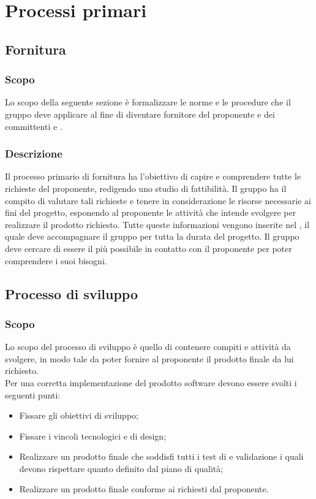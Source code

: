 \section{Processi primari}
\subsection{Fornitura}
\subsubsection{Scopo}
Lo scopo della seguente sezione è formalizzare le norme e le procedure che il gruppo \Gruppo{} deve applicare al fine di diventare fornitore del proponente \Proponente{} e dei committenti \VT{} e \CR{}.

\subsubsection{Descrizione} 
Il processo primario di fornitura ha l'obiettivo di capire e comprendere tutte le richieste del proponente, redigendo uno studio di fattibilità. 
Il gruppo \Gruppo{} ha il compito di valutare tali richieste e tenere in considerazione le risorse necessarie ai fini del progetto, esponendo al proponente \Proponente{} le attività che intende svolgere per realizzare il prodotto richiesto.
Tutte queste informazioni vengono inserite nel \PdP{}, il quale deve accompagnare il gruppo per tutta la durata del progetto.
Il gruppo \Gruppo{} deve cercare di essere il più possibile in contatto con il proponente per poter comprendere i suoi bisogni.



\subsection{Processo di sviluppo}
\subsubsection{Scopo}
Lo scopo del processo di sviluppo è quello di contenere compiti e attività da svolgere, in modo tale da poter fornire al proponente il prodotto finale da lui richiesto.\\
Per una corretta implementazione del prodotto software devono essere svolti i seguenti punti: 
\begin{itemize}
	\item Fissare gli obiettivi di sviluppo;
	\item Fissare i vincoli tecnologici e di design;
	\item Realizzare un prodotto finale che soddisfi tutti i test di  e validazione i quali devono rispettare quanto definito dal piano di qualità;
	\item Realizzare un prodotto finale conforme ai  richiesti dal proponente.
\end{itemize}
